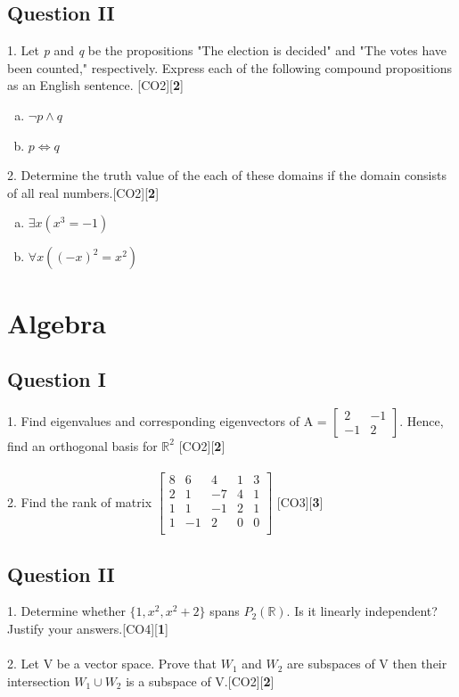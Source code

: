 \documentclass[a4paper]{article}
\begin{document}
\subsection*{Question II}
1. Let \textit{p} and \textit{q} be the propositions "The election is decided" and "The votes have been counted," respectively. Express each of the following compound propositions as an English sentence. \hfill [CO2][{\bf 2}]
\begin{enumerate}[a)]
\item $\neg p \land q$
\item $ p \iff q $
\end{enumerate} 
2. Determine the truth value of the each of these domains if the domain consists of all real numbers.\hfill [CO2][{\bf 2}]
\begin{enumerate}[a)]
\item $\exists x (x^3 = -1) $
\item $\forall x((-x)^2 = x^2)$
\end{enumerate} 


\newpage
\section{Algebra}
\subsection*{Question I}
1. Find eigenvalues and corresponding eigenvectors of A = 
	$\begin{bmatrix}
	2 & -1 \\ -1 & 2
	\end{bmatrix}$. Hence, find an orthogonal basis for $ \mathbb{R}  ^2$ \cite{real}
	\hfill [CO2][{\bf 2}]\\ \\
2. Find the rank of matrix $
	\begin{bmatrix}
	8 & 6 & 4 & 1 & 3\\
	2 & 1 & -7 & 4 & 1\\	
	1 & 1 & -1 & 2 & 1\\
	1 & -1 & 2 & 0 & 0\\
	\end{bmatrix}$ 
	\hfill [CO3][{\bf 3}]
\subsection*{Question II}
1. Determine whether $\lbrace 1, x^2, x^2 + 2 \rbrace$ spans $P_2(\mathbb{R})$. Is it linearly independent? Justify your answers.\hfill [CO4][{\bf 1}]\\ \\
2. Let V be a vector space. Prove that $W_1$ and $W_2$  are subspaces of V then their intersection $W_1 \cup W_2$ is a subspace of V.\hfill [CO2][{\bf 2}]
\newpage
\end{document}
